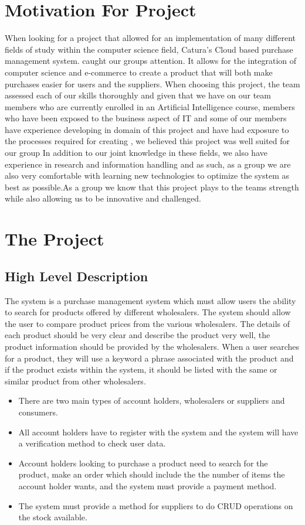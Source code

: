 \documentclass[11pt]{article}
\begin{document}
\section{Motivation For Project}
When looking for a project that allowed for an implementation of many different fields of study within the computer science field, Catura's Cloud based purchase management system. caught our groups attention. It allows for the integration of computer science and e-commerce to create a product that will both make purchases easier for users and the suppliers. 
\newline When choosing this project, the team assessed each of our skills thoroughly and given that we have on our team members who are currently enrolled in an Artificial Intelligence course, members who have been exposed to the business aspect of IT and some of our members have experience developing in domain of this project and have had exposure to the processes required for creating , we believed this project was well suited for our group
\newline In addition to our joint knowledge in these fields, we  also have experience in research and information handling and as such, as a group we are also very comfortable with learning new technologies to optimize the system as best as possible.As a group we know that this project plays to the teams strength while also allowing us to be innovative and challenged.
\section{The Project}
\subsection{High Level Description}
The system is a purchase management system which must allow users the ability to search for products offered by different wholesalers. The system should allow the user to compare product prices from the various wholesalers. The details of each product should be very clear and describe the product very well, the product information should be provided by the wholesalers. When a user searches for a product, they will use a keyword a phrase associated with the product and if the product exists within the system, it should be listed with the same or similar product from other wholesalers.
\begin{itemize}
\item There are two main types of account holders, wholesalers or suppliers and consumers.
\item All account holders have to register with the system and the system will have a verification method to check user data.
\item Account holders looking to purchase a product need to search for the product, make an order which should include the the number of items the account holder wants, and the system must provide a payment method.
\item The system must provide a method for suppliers to do CRUD operations on the stock available.
\end{itemize}
\end{document}
